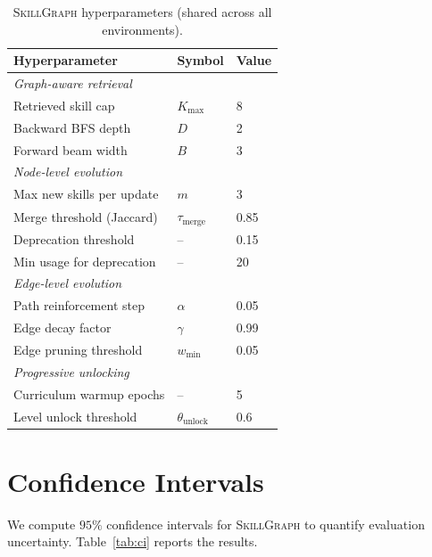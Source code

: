 \begin{table}[h]
    \caption{\textsc{SkillGraph} hyperparameters (shared across all environments).}
    \label{tab:hyperparams_graph}
    \centering
    \footnotesize
    \begin{tabular}{lll}
    \toprule
    Hyperparameter & Symbol & Value \\
    \midrule
    \multicolumn{3}{l}{\textit{Graph-aware retrieval}} \\
    Retrieved skill cap & $K_{\max}$ & 8 \\
    Backward BFS depth & $D$ & 2 \\
    Forward beam width & $B$ & 3 \\
    \midrule
    \multicolumn{3}{l}{\textit{Node-level evolution}} \\
    Max new skills per update & $m$ & 3 \\
    Merge threshold (Jaccard) & $\tau_{\text{merge}}$ & 0.85 \\
    Deprecation threshold & -- & 0.15 \\
    Min usage for deprecation & -- & 20 \\
    \midrule
    \multicolumn{3}{l}{\textit{Edge-level evolution}} \\
    Path reinforcement step & $\alpha$ & 0.05 \\
    Edge decay factor & $\gamma$ & 0.99 \\
    Edge pruning threshold & $w_{\min}$ & 0.05 \\
    \midrule
    \multicolumn{3}{l}{\textit{Progressive unlocking}} \\
    Curriculum warmup epochs & -- & 5 \\
    Level unlock threshold & $\theta_{\text{unlock}}$ & 0.6 \\
    \bottomrule
    \end{tabular}
\end{table}

\section{Confidence Intervals}
\label{app:bootstrap_ci}

We compute $95\%$ confidence intervals for \textsc{SkillGraph} to quantify evaluation uncertainty. Table~\ref{tab:ci} reports the results.


